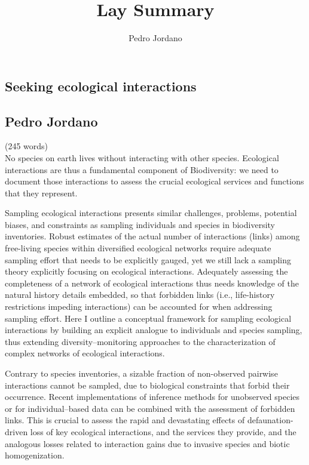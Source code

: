 \documentclass[a4paper,12pt]{article}
\begin{document}
\title{Lay Summary}

\author{Pedro Jordano}

\maketitle
\newpage
\begin{spacing}{1.5}
\section*{Seeking ecological interactions}
\subsection*{Pedro Jordano}
(245 words)\\

No species on earth lives without interacting with other species. Ecological interactions are thus a fundamental component of Biodiversity: we need to document those interactions to assess the crucial ecological services and functions that they represent.

Sampling ecological interactions presents similar challenges, problems, potential biases, and constraints as sampling individuals and species in biodiversity inventories. Robust estimates of the actual number of interactions (links) among free-living species within diversified ecological networks require adequate sampling effort that needs to be explicitly gauged, yet we still lack a sampling theory explicitly focusing on ecological interactions. Adequately assessing the completeness of a network of ecological interactions thus needs knowledge of the natural history details embedded, so that forbidden links (i.e., life-history restrictions impeding interactions) can be accounted for when addressing sampling effort. Here I outline a conceptual framework for sampling ecological interactions by building an explicit analogue to individuals and species sampling, thus extending diversity--monitoring approaches to the characterization of complex networks of ecological interactions. 

Contrary to species inventories, a sizable fraction of non-observed pairwise interactions cannot be sampled, due to biological constraints that forbid their occurrence. Recent implementations of inference methods for unobserved species or for individual--based data can be combined with the assessment of forbidden links. This is crucial to assess the rapid and devastating effects of defaunation-driven loss of key ecological interactions, and the services they provide, and the analogous losses related to interaction gains due to invasive species and biotic homogenization.

\end{spacing}
\end{document}
